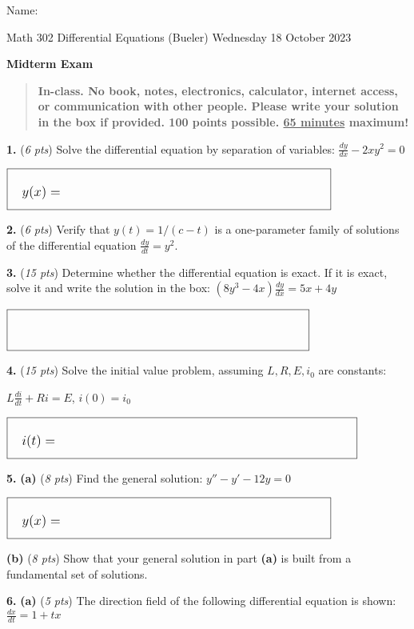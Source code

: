 \documentclass[11pt]{amsart}
\newcommand{\ds}{\displaystyle}
\newcommand{\prob}[1]{\bigskip\noindent\textbf{#1.} }
\newcommand{\pts}[1]{(\emph{#1 pts})}
\newcommand{\probpts}[2]{\prob{#1} \pts{#2} \quad}
\newcommand{\ppartpts}[2]{\textbf{(#1)} \pts{#2} \quad}
\newcommand{\epartpts}[2]{\medskip\noindent \textbf{(#1)} \pts{#2} \quad}
\newcommand{\boxy}[1]{\fbox{\Huge \strut \hspace{#1mm} \strut}}
\newcommand{\boxycontent}[2]{\fbox{\quad {\large #2} {\Huge \strut \hspace{#1mm} \strut}}}
\begin{document}
\hfill \Large Name:\underline{\phantom{Ed Bueler really really long long long name}}
\medskip

\scriptsize \noindent Math 302 Differential Equations (Bueler) \hfill Wednesday 18 October 2023
\medskip

\LARGE\centerline{\textbf{Midterm Exam}}

\smallskip
\begin{quote}
\large
\textbf{In-class.  No book, notes, electronics, calculator, internet access, or communication with other people.  Please write your solution in the box if provided.  100 points possible.  \underline{65 minutes} maximum!}
\end{quote}

\normalsize

\thispagestyle{empty}

\probpts{1}{6}  Solve the differential equation by separation of variables: \quad $\ds \frac{dy}{dx} - 2 x y^2 = 0$
\vfill

\hfill $\boxycontent{80}{$y(x)=$}$

\probpts{2}{6}  Verify that $y(t) = 1 / (c - t)$ is a one-parameter family of solutions of the differential equation \quad $\ds \frac{dy}{dt} = y^2$.
\vfill


\clearpage
\newpage
\probpts{3}{15}  Determine whether the differential equation is exact.  If it is exact, solve it and write the solution in the box: \quad {\huge \strut}$\ds \left(8 y^3 - 4x\right) \frac{dy}{dx} = 5x + 4y$
\vfill

\hfill $\boxy{90}$


\clearpage
\newpage
\probpts{4}{15}  Solve the initial value problem, assuming $L,R,E,i_0$ are constants:

\medskip
\hspace{19mm} $\ds L\frac{di}{dt} + R i = E$, \quad $i(0)=i_0$
\vfill

\hfill $\boxycontent{90}{$i(t)=$}$


\clearpage
\newpage
\prob{5}  \ppartpts{a}{8}  Find the general solution: \quad $\ds y'' - y' - 12 y = 0$
\vfill

\hfill $\boxycontent{80}{$y(x)=$}$

\bigskip
\epartpts{b}{8}  Show that your general solution in part \textbf{(a)} is built from a fundamental set of solutions.
\vfill


\clearpage
\newpage
\prob{6}  \ppartpts{a}{5}  The direction field of the following differential equation is shown: \quad $\ds \frac{dx}{dt} = 1 + t x$
\end{document}
